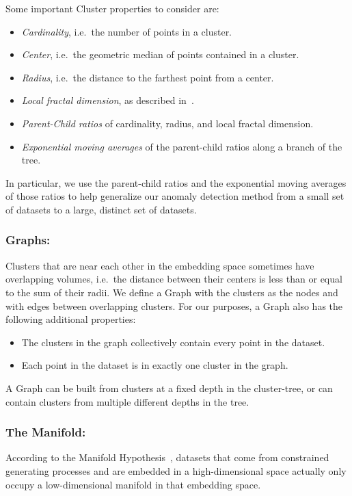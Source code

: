 Some important Cluster properties to consider are:
\begin{itemize}
    \item \textit{Cardinality}, i.e.\ the number of points in a cluster.
    \item \textit{Center}, i.e.\ the geometric median of points contained in a cluster.
    \item \textit{Radius}, i.e.\ the distance to the farthest point from a center.
    \item \textit{Local fractal dimension}, as described in~\cite{ishaq2019entropy}.
    \item \textit{Parent-Child ratios} of cardinality, radius, and local fractal dimension.
    \item \textit{Exponential moving averages} of the parent-child ratios along a branch of the tree.
\end{itemize}
In particular, we use the parent-child ratios and the exponential moving averages of those ratios to help generalize our anomaly detection method from a small set of datasets to a large, distinct set of datasets.

\subsubsection*{Graphs:}
Clusters that are near each other in the embedding space sometimes have overlapping volumes, i.e.\ the distance between their centers is less than or equal to the sum of their radii.
We define a Graph with the clusters as the nodes and with edges between overlapping clusters.
For our purposes, a Graph also has the following additional properties:
\begin{itemize}
    \item The clusters in the graph collectively contain every point in the dataset.
    \item Each point in the dataset is in exactly one cluster in the graph.
\end{itemize}
A Graph can be built from clusters at a fixed depth in the cluster-tree, or can contain clusters from multiple different depths in the tree.

\subsubsection*{The Manifold:}
According to the Manifold Hypothesis~\cite{fefferman2016testing}, datasets that come from constrained generating processes and are embedded in a high-dimensional space actually only occupy a low-dimensional manifold in that embedding space.

